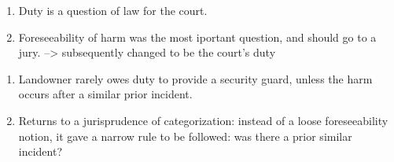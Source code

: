 %
\begin{enumerate}
    \item Duty is a question of law for the court.
    \item Foreseeability of harm was the most iportant question, and should go to a jury. --> subsequently changed to be the court's duty
\end{enumerate}
%
%
\begin{enumerate}
\item Landowner rarely owes duty to provide a security guard, unless the harm occurs after a similar prior incident.
\item Returns to a jurisprudence of categorization: instead of a loose foreseeability notion, it gave a narrow rule to be followed: was there a prior similar incident?
\end{enumerate}
